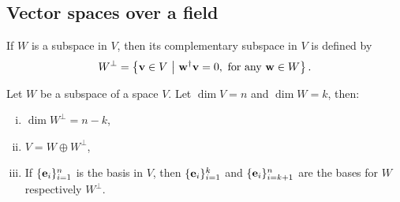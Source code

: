 \subsection{Vector spaces over a field}

%
%

\begin{definition}\label{def:orthsubspace}
	\cite[12.7]{Holst} If $W$ is a subspace in $V$, then its complementary subspace in $V$ is defined by 
	\[
	W^\perp = \left\lbrace \mathbf{v} \in V \ \middle\vert \ \mathbf{w}^\dagger \mathbf{v} = 0, \text{ for any } \mathbf{w} \in W \right\rbrace.
	\]
\end{definition}

\begin{lemma}\label{lemma:compsubspace}\cite[Thm 12.16]{Holst}
	Let $W$ be a subspace of a space $V$. Let $\dim V = n$ and $\dim W = k$, then:
	\noindent
	\begin{enumerate}[i)]
		\setlength\itemsep{-0.5em}
		\item $\dim W^\perp = n - k$,
		\item $V = W \oplus W^\perp$,
		\item If $\{\mathbf{e}_i\}_{i=1}^{n}$ is the basis in $V$, then $\{\mathbf{e}_i\}_{i=1}^{k}$ and $\{\mathbf{e}_i\}_{i=k+1}^{n}$ are the bases for $W$ respectively $W^\perp$.
	\end{enumerate}
\end{lemma}

